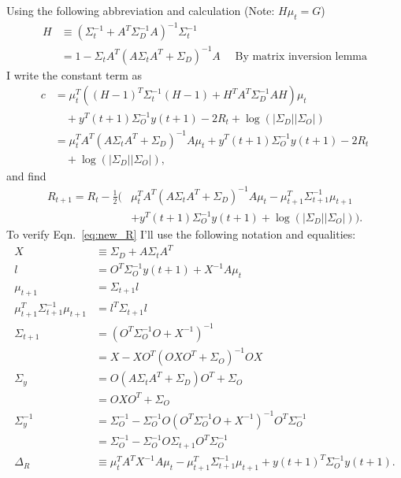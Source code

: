 \documentclass[11pt]{article}
\newcommand{\ti}[2]{{#1}{(#2)}}                         %
\newcommand{\logdet}{\log\left(\left|\Sigma_D\right| \left| \Sigma_O
    \right| \right)}
\begin{document}
Using the following abbreviation and calculation (Note: $H\mu_t = G$)
\begin{align*}
  H &\equiv (\Sigma_t^{-1} + A^T \Sigma_D^{-1}A)^{-1} \Sigma_t^{-1} \\
  &= 1 - \Sigma_t A^T(A\Sigma_t A^T + \Sigma_D)^{-1} A \quad \text{ By
    matrix inversion lemma}
\end{align*}
I write the constant term as
\begin{align*}
  c &= \mu_t^T \left( (H-1)^T\Sigma_t^{-1} (H-1) + H^TA^T\Sigma_D^{-1}
    AH \right) \mu_t \\
  & \quad + \ti{y^T}{t+1} \Sigma_O^{-1}
  \ti{y}{t+1} - 2R_t + \logdet\\
  &= \mu_t^T  A^T(A\Sigma_t A^T + \Sigma_D)^{-1}A \mu_t
  + \ti{y^T}{t+1} \Sigma_O^{-1} \ti{y}{t+1} - 2R_t \\
  & \quad + \logdet,
\end{align*}
and find
\begin{align*}
  R_{t+1} = R_t -\frac{1}{2} \Big( &
  \mu_t^T  A^T(A\Sigma_t A^T + \Sigma_D)^{-1}A \mu_t 
   - \mu_{t+1}^T \Sigma_{t+1}^{-1} \mu_{t+1} \\
  & + \ti{y^T}{t+1} \Sigma_O^{-1} \ti{y}{t+1} + \logdet \Big).
\end{align*}
To verify Eqn.~\eqref{eq:new_R} I'll use the following notation and
equalities:
\begin{align}
  X &\equiv \Sigma_D + A \Sigma_t A^T \\
  l &= O^T\Sigma_O^{-1} \ti{y}{t+1} + X^{-1} A \mu_t \\
  \mu_{t+1} &= \Sigma_{t+1} l \\
  \mu_{t+1}^T \Sigma_{t+1}^{-1} \mu_{t+1} &= l^T \Sigma_{t+1} l \\
  \Sigma_{t+1} &= (O^T\Sigma_O^{-1}O + X^{-1})^{-1} \\
  &= X - XO^T(OXO^T + \Sigma_O)^{-1} OX \\
  \Sigma_y &= O(A\Sigma_t A^T + \Sigma_D) O^T + \Sigma_O \\
  &= OXO^T + \Sigma_O \\
  \Sigma_y^{-1} &= \Sigma_O^{-1} - \Sigma_O^{-1} O (O^T\Sigma_O^{-1}O
  + X^{-1})^{-1}O^T \Sigma_O^{-1} \\
  &= \Sigma_O^{-1} - \Sigma_O^{-1} O \Sigma_{t+1}O^T \Sigma_O^{-1} \\
  \Delta_R &\equiv \mu_t^TA^T X^{-1} A \mu_t - \mu_{t+1}^T
  \Sigma_{t+1}^{-1} \mu_{t+1} + \ti{y}{t+1}^T \Sigma_O^{-1} \ti{y}{t+1}.
\end{align}
\end{document}
